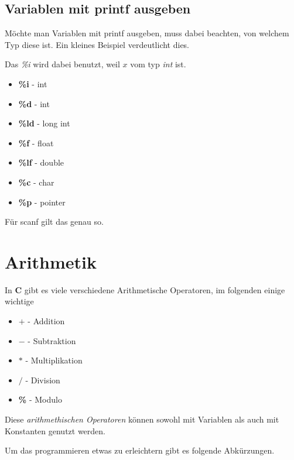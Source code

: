 \documentclass[c_worksheet.tex]{subfiles}
\begin{document}
\subsection{Variablen mit printf ausgeben} 

Möchte man Variablen mit printf ausgeben, muss dabei beachten, von welchem Typ diese ist. Ein kleines Beispiel verdeutlicht dies.



Das \emph{\%i} wird dabei benutzt, weil \(x\) vom typ \emph{int} ist.

\begin{itemize}
	\item \textbf{\%i} - int
	\item \textbf{\%d} - int
	\item \textbf{\%ld} - long int
	\item \textbf{\%f} - float
	\item \textbf{\%lf} - double
	\item \textbf{\%c} - char
	\item \textbf{\%p} - pointer 
\end{itemize}

Für scanf gilt das genau so.

\section{Arithmetik}

In \textbf{C} gibt es viele verschiedene Arithmetische Operatoren, im folgenden einige wichtige

\begin{itemize}
 	\item \textbf{\(+\)} - Addition
 	\item \textbf{\(-\)} - Subtraktion
 	\item \textbf{\(*\)} - Multiplikation
 	\item \textbf{\(/\)} - Division
 	\item \textbf{\%} - Modulo   
 \end{itemize} 

 Diese \emph{arithmethischen Operatoren} können sowohl mit Variablen als auch mit Konstanten genutzt werden.

  

Um das programmieren etwas zu erleichtern gibt es folgende Abkürzungen.

 
\end{document}
